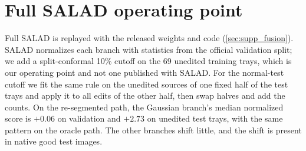\section{Full SALAD operating point}
\label{sec:supp_full}
\begin{table}[t]
\centering
\caption{SALAD's full system on matched pushpin trays (re-segmented path; alarms out of 138). Native: logical AUROC (\%). The validation cutoff uses SALAD's validation-based normalization with a 10\% split-conformal cutoff; the normal-test cutoff is refit on one half of the unedited test trays and applied to the other.}
\label{tab:system}
\small\setlength{\tabcolsep}{1.9pt}

\end{table}
Full SALAD is replayed with the released weights and code (\cref{sec:supp_fusion}). SALAD normalizes each branch with statistics from the official validation split; we add a split-conformal 10\% cutoff on the 69 unedited training trays, which is our operating point and not one published with SALAD. For the normal-test cutoff we fit the same rule on the unedited sources of one fixed half of the test trays and apply it to all edits of the other half, then swap halves and add the counts. On the re-segmented path, the Gaussian branch's median normalized score is $+0.06$ on validation and $+2.73$ on unedited test trays, with the same pattern on the oracle path. The other branches shift little, and the shift is present in native good test images.
